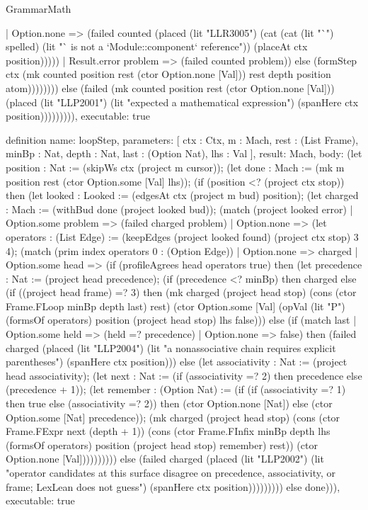 \begin{lexlean}{GrammarMath}
\begin{semanticmodule}
{{{{        | Option.none => (failed counted (placed (lit "LLR3005") (cat (cat (lit "`") spelled) (lit "` is not a `Module::component` reference")) (placeAt ctx position)))))
      | Result.error problem => (failed counted problem)) else (formStep ctx (mk counted position rest (ctor Option.none [Val])) rest depth position atom)))))))) else (failed (mk counted position rest (ctor Option.none [Val])) (placed (lit "LLP2001") (lit "expected a mathematical expression") (spanHere ctx position))))))))),
  executable: true
}

definition{
  name: loopStep,
  parameters: [
    ctx : Ctx,
    m : Mach,
    rest : (List Frame),
    minBp : Nat,
    depth : Nat,
    last : (Option Nat),
    lhs : Val
  ],
  result: Mach,
  body: (let position : Nat := (skipWs ctx (project m cursor)); (let done : Mach := (mk m position rest (ctor Option.some [Val] lhs)); (if (position <? (project ctx stop)) then (let looked : Looked := (edgesAt ctx (project m bud) position); (let charged : Mach := (withBud done (project looked bud)); (match (project looked error)
    | Option.some problem => (failed charged problem)
    | Option.none => (let operators : (List Edge) := (keepEdges (project looked found) (project ctx stop) 3 4); (match (prim index operators 0 : (Option Edge))
      | Option.none => charged
      | Option.some head => (if (profileAgrees head operators true) then (let precedence : Nat := (project head precedence); (if (precedence <? minBp) then charged else (if ((project head frame) =? 3) then (mk charged (project head stop) (cons (ctor Frame.FLoop minBp depth last) rest) (ctor Option.some [Val] (opVal (lit "P") (formsOf operators) position (project head stop) lhs false))) else (if (match last
        | Option.some held => (held =? precedence)
        | Option.none => false) then (failed charged (placed (lit "LLP2004") (lit "a nonassociative chain requires explicit parentheses") (spanHere ctx position))) else (let associativity : Nat := (project head associativity); (let next : Nat := (if (associativity =? 2) then precedence else (precedence + 1)); (let remember : (Option Nat) := (if (if (associativity =? 1) then true else (associativity =? 2)) then (ctor Option.none [Nat]) else (ctor Option.some [Nat] precedence)); (mk charged (project head stop) (cons (ctor Frame.FExpr next (depth + 1)) (cons (ctor Frame.FInfix minBp depth lhs (formsOf operators) position (project head stop) remember) rest)) (ctor Option.none [Val]))))))))) else (failed charged (placed (lit "LLP2002") (lit "operator candidates at this surface disagree on precedence, associativity, or frame; LexLean does not guess") (spanHere ctx position))))))))) else done))),
  executable: true
}

}}}
\end{semanticmodule}
\end{lexlean}
